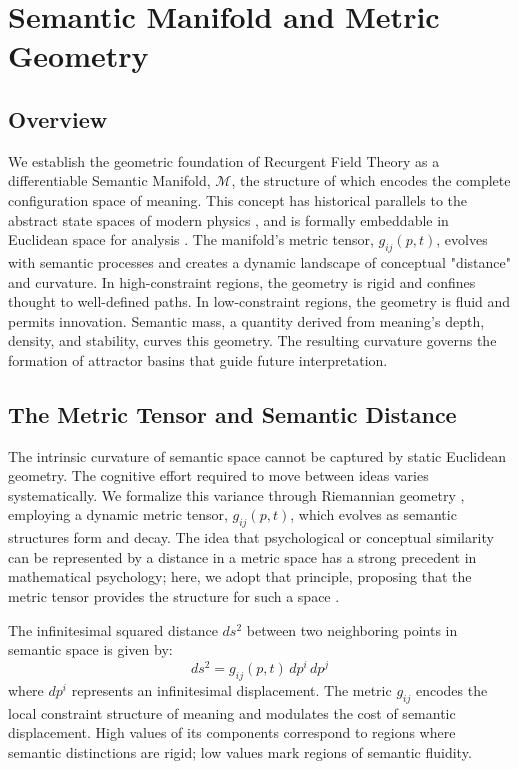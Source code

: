 \chapter{Semantic Manifold and Metric Geometry}\label{ch:semantic_manifold_geometry}

\section{Overview}

We establish the geometric foundation of Recurgent Field Theory as a differentiable Semantic Manifold, \(\mathcal{M}\), the structure of which encodes the complete configuration space of meaning. This concept has historical parallels to the abstract state spaces of modern physics \autocite{vonNeumann1932}, and is formally embeddable in Euclidean space for analysis \autocite{Whitney1936}. The manifold's metric tensor, \(g_{ij}(p, t)\), evolves with semantic processes and creates a dynamic landscape of conceptual "distance" and curvature. In high-constraint regions, the geometry is rigid and confines thought to well-defined paths. In low-constraint regions, the geometry is fluid and permits innovation. Semantic mass, a quantity derived from meaning's depth, density, and stability, curves this geometry. The resulting curvature governs the formation of attractor basins that guide future interpretation.

\section{The Metric Tensor and Semantic Distance}

The intrinsic curvature of semantic space cannot be captured by static Euclidean geometry. The cognitive effort required to move between ideas varies systematically. We formalize this variance through Riemannian geometry \autocite{Riemann1868, doCarmo1992}, employing a dynamic metric tensor, \(g_{ij}(p,t)\), which evolves as semantic structures form and decay. The idea that psychological or conceptual similarity can be represented by a distance in a metric space has a strong precedent in mathematical psychology; here, we adopt that principle, proposing that the metric tensor provides the structure for such a space \autocite{Shepard1987}.

The infinitesimal squared distance \(ds^2\) between two neighboring points in semantic space is given by:
\begin{equation}
ds^2 = g_{ij}(p, t) \, dp^i \, dp^j
\end{equation}
where \(dp^i\) represents an infinitesimal displacement. The metric \(g_{ij}\) encodes the local constraint structure of meaning and modulates the cost of semantic displacement. High values of its components correspond to regions where semantic distinctions are rigid; low values mark regions of semantic fluidity.

